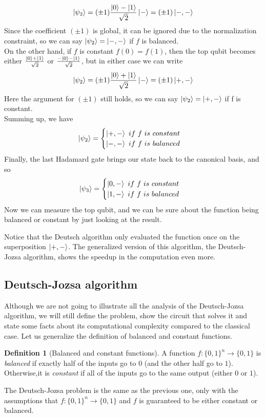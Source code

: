 \documentclass[12pt,a4paper]{report}
\theoremstyle{definition}
\newtheorem{definition}{Definition}[section]
\theoremstyle{definition}
\theoremstyle{definition}
\begin{document}
\begin{equation*}
    \ket{\psi_2}=(\pm 1)\frac{\ket{0}-\ket{1}}{\sqrt{2}}\ket{-}=(\pm 1)\ket{-,-}
\end{equation*}
Since the coefficient $(\pm 1)$ is global, it can be ignored due to the normalization constraint, so we can say $\ket{\psi_2}=\ket{-,-}$ if $f$ is balanced.\\
On the other hand, if $f$ is constant $f(0)=f(1)$, then the top qubit becomes either $\frac{\ket{0}+\ket{1}}{\sqrt{2}}$ or $\frac{-\ket{0}-\ket{1}}{\sqrt{2}}$, but in either case we can write
\begin{equation*}
    \ket{\psi_2}=(\pm 1)\frac{\ket{0}+\ket{1}}{\sqrt{2}}\ket{-}=(\pm 1)\ket{+,-}
\end{equation*}
Here the argument for $(\pm 1)$ still holds, so we can say $\ket{\psi_2}=\ket{+,-}$ if f is constant.\\
Summing up, we have
\begin{equation*}
    \ket{\psi_2}=\begin{cases}
        \ket{+,-}\ if\ f\ is\ constant\\
        \ket{-,-}\ if\ f\ is\ balanced
    \end{cases}
\end{equation*}
Finally, the last Hadamard gate brings our state back to the canonical basis, and so
\begin{equation*}
    \ket{\psi_3} = \begin{cases}
        \ket{0,-}\ if\ f\ is\ constant\\
        \ket{1,-}\ if\ f\ is\ balanced
    \end{cases}
\end{equation*}
Now we can measure the top qubit, and we can be sure about the function being balanced or constant by just looking at the result.

Notice that the Deutsch algorithm only evaluated the function once on the superposition $\ket{+,-}$. The generalized version of this algorithm, the Deutsch-Jozsa algorithm, shows the speedup in the computation even more.






\subsection{Deutsch-Jozsa algorithm}
Although we are not going to illustrate all the analysis of the Deutsch-Jozsa algorithm, we will still define the problem, show the circuit that solves it and state some facts about its computational complexity compared to the classical case.
Let us generalize the definition of balanced and constant functions.
\begin{definition}[Balanced and constant functions]
    A function $f: \{0,1\}^n \longrightarrow \{0,1\}$ is \textit{balanced} if exactly half of the inputs go to $0$ (and the other half go to $1$). Otherwise,it is \textit{constant} if all of the inputs go to the same output (either $0$ or $1$).
\end{definition}
The Deutsch-Jozsa problem is the same as the previous one, only with the assumptions that $f:\{0,1\}^n\longrightarrow \{0,1\}$ and $f$ is guaranteed to be either constant or balanced.
\end{document}
